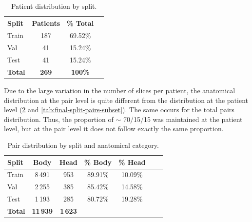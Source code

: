 \begin{table}[H]
    \centering
    \begin{tabular}{lccc}
        \hline
        \textbf{Split} & \textbf{Patients} & \textbf{\% Total}\\
        \hline
        Train  & 187 & 69.52\%\\
        Val    & 41 & 15.24\%\\
        Test   & 41 & 15.24\%\\
        \hline
        \textbf{Total} & \textbf{269} & \textbf{100\%} \\
        \hline
    \end{tabular}
    \captionsetup{skip=2pt}
    \caption[Patient distribution by split]{Patient distribution by split.}
    \label{tab:final-split-patient-subset}
\end{table}
\FloatBarrier

Due to the large variation in the number of slices per patient, the anatomical distribution at the pair level is quite different from the distribution at the patient level (\ref{tab:final-split-pairs} and \ref{tab:final-split-pairs-subset}). The same occurs for the total pairs distribution. Thus, the proportion of $\sim$ 70/15/15 was maintained at the patient level, but at the pair level it does not follow exactly the same proportion.

\begin{table}[H]
    \centering
    \begin{tabular}{lcccccc}
        \hline
        \textbf{Split}  & \textbf{Body} & \textbf{Head}  & \textbf{\% Body} & \textbf{\% Head}\\
        \hline
        Train  & 8\,491 & 953 & 89.91\% & 10.09\%\\
        Val    & 2\,255 & 385 & 85.42\% & 14.58\%\\
        Test   & 1\,193 & 285 & 80.72\% & 19.28\%\\
        \hline
        \textbf{Total} & \textbf{11\,939} & \textbf{1\,623} & \textbf{--} & \textbf{--} \\
        \hline
    \end{tabular}
    \centering
    \captionsetup{skip=2pt}
    \caption[Pair distribution by split and anatomical category]{Pair distribution by split and anatomical category.}
    \label{tab:final-split-pairs}
\end{table}

